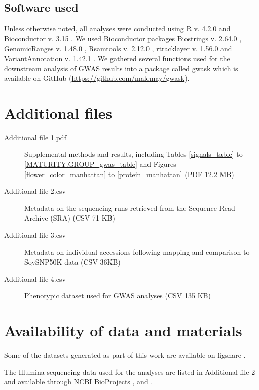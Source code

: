 \subsection*{Software used}
\label{sv-gwas-software-used}

Unless otherwise noted, all analyses were conducted using R v. 4.2.0
\citep{r2022} and Bioconductor v. 3.15 \citep{huber2015}. We used Bioconductor
packages Biostrings v. 2.64.0 \citep{pages2022}, GenomicRanges v. 1.48.0
\citep{lawrence2013}, Rsamtools v. 2.12.0 \citep{rsamtools2022}, rtracklayer v.
1.56.0 \citep{lawrence2009} and VariantAnnotation v. 1.42.1
\citep{obenchain2014}.  We gathered several functions used for the downstream
analysis of GWAS results into a package called gwask which is available on
GitHub (\url{https://github.com/malemay/gwask}).

\section*{Additional files}
\label{sv-gwas-additional-files}

\begin{description}
	\item[Additional file 1.pdf] Supplemental methods and results,
		including Tables \ref{signals_table} to \ref{MATURITY.GROUP_gwas_table}
		and Figures \ref{flower_color_manhattan} to \ref{protein_manhattan}
		(PDF 12.2 MB)
	\item[Additional file 2.csv] Metadata on the sequencing runs retrieved
		from the Sequence Read Archive (SRA) (CSV 71 KB)
	\item[Additional file 3.csv] Metadata on individual accessions following mapping
		and comparison to SoySNP50K data (CSV 36KB)
	\item[Additional file 4.csv] Phenotypic dataset used for GWAS analyses (CSV 135
		KB)
\end{description}

\section*{Availability of data and materials}
\label{sv-gwas-availability}

Some of the datasets generated as part of this work are available on figshare
\citep{kmer-gwas-figshare}.

The Illumina sequencing data used for the analyses are listed in Additional file 2
and available through NCBI BioProjects \citeauthor{PRJNA257011}, \citeauthor{PRJNA289660}
and \citeauthor{PRJNA639876}.

